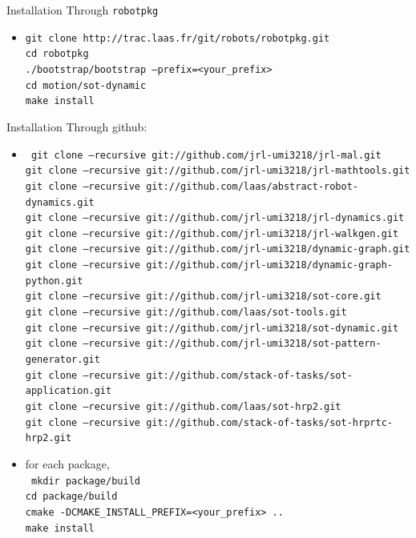 %
%

\begin{frame} {Installation}
  Through \texttt {robotpkg}
  \begin{itemize}
  \item \texttt {\tiny git clone http://trac.laas.fr/git/robots/robotpkg.git\\
    cd robotpkg\\
    ./bootstrap/bootstrap --prefix=<your\_prefix>\\
    cd motion/sot-dynamic\\
    make install}
  \end{itemize}
\end{frame}

\begin{frame} {Installation}
  Through github:
  \begin{itemize}
  \item \texttt {\tiny
    git clone --recursive git://github.com/jrl-umi3218/jrl-mal.git\\
    git clone --recursive git://github.com/jrl-umi3218/jrl-mathtools.git\\
    git clone --recursive git://github.com/laas/abstract-robot-dynamics.git\\
    git clone --recursive git://github.com/jrl-umi3218/jrl-dynamics.git\\
    git clone --recursive git://github.com/jrl-umi3218/jrl-walkgen.git\\
    git clone --recursive git://github.com/jrl-umi3218/dynamic-graph.git\\
    git clone --recursive git://github.com/jrl-umi3218/dynamic-graph-python.git\\
    git clone --recursive git://github.com/jrl-umi3218/sot-core.git\\
    git clone --recursive git://github.com/laas/sot-tools.git\\
    git clone --recursive git://github.com/jrl-umi3218/sot-dynamic.git\\
    git clone --recursive git://github.com/jrl-umi3218/sot-pattern-generator.git\\
    git clone --recursive git://github.com/stack-of-tasks/sot-application.git\\
    git clone --recursive git://github.com/laas/sot-hrp2.git\\
    git clone --recursive git://github.com/stack-of-tasks/sot-hrprtc-hrp2.git\\
  }
    \pause
  \item for each package,\\
    \texttt {\tiny
      mkdir package/build\\
      cd package/build\\
      cmake -DCMAKE\_INSTALL\_PREFIX=<your\_prefix> ..\\
      make install}      
    \end{itemize}
\end{frame}

